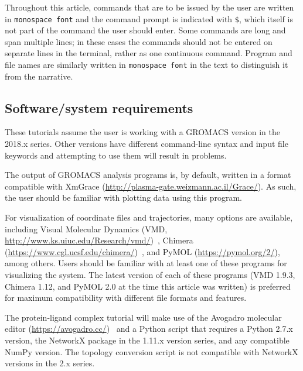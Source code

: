 \documentclass[9pt,tutorial]{livecoms}
\begin{document}
Throughout this article, commands that are to be issued by the user are written in \texttt{monospace font} and the command prompt is indicated with \texttt{\$}, which itself is not part of the command the user should enter. Some commands are long and span multiple lines; in these cases the commands should not be entered on separate lines in the terminal, rather as one continuous command. Program and file names are similarly written in \texttt{monospace font} in the text to distinguish it from the narrative.

\subsection{Software/system requirements}
These tutorials assume the user is working with a GROMACS version in the 2018.x series. Other versions have different command-line syntax and input file keywords and attempting to use them will result in problems.

The output of GROMACS analysis programs is, by default, written in a format compatible with XmGrace (\url{http://plasma-gate.weizmann.ac.il/Grace/}). As such, the user should be familiar with plotting data using this program.

For visualization of coordinate files and trajectories, many options are available, including Visual Molecular Dynamics (VMD, \url{http://www.ks.uiuc.edu/Research/vmd/})~\cite{Humphrey1996}, Chimera (\url{https://www.cgl.ucsf.edu/chimera/})~\cite{Petersen2004}, and PyMOL (\url{https://pymol.org/2/}), among others. Users should be familiar with at least one of these programs for visualizing the system. The latest version of each of these programs (VMD 1.9.3, Chimera 1.12, and PyMOL 2.0 at the time this article was written) is preferred for maximum compatibility with different file formats and features.

The protein-ligand complex tutorial will make use of the Avogadro molecular editor (\url{https://avogadro.cc/})~\cite{Hanwell2012} and a Python script that requires a Python 2.7.x version, the NetworkX package in the 1.11.x version series, and any compatible NumPy version. The topology conversion script is not compatible with NetworkX versions in the 2.x series.
\end{document}
